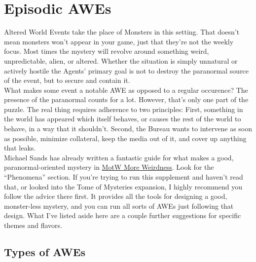 \documentclass[12pt,oneside,landscape]{memoir}
\begin{document}
\begin{multicols}{2}
\section*{Episodic AWEs}
Altered World Events take the place of Monsters in this setting.  That doesn’t mean monsters won’t appear in your game, just that they're not the weekly focus.  Most times the mystery will revolve around something weird, unpredictable, alien, or altered.  Whether the situation is simply unnatural or actively hostile the Agents’ primary goal is not to destroy the paranormal source of the event, but to secure and contain it.
\\[4mm]
What makes some event a notable AWE as opposed to a regular occurence?  The presence of the paranormal counts for a lot.  However, that's only one part of the puzzle.  The real thing requires adherence to two principles:  First, something in the world has appeared which itself behaves, or causes the rest of the world to behave, in a way that it shouldn’t.  Second, the Bureau wants to intervene as soon as possible, minimize collateral, keep the media out of it, and cover up anything that leaks.  
\\[4mm]
Michael Sands has already written a fantastic guide for what makes a good, paranormal-oriented mystery in \href{https://genericgames.co.nz/files/MotW_more_weirdness.pdf}{MotW More Weirdness}.  Look for the “Phenomena” section.  If you’re trying to run this supplement and haven’t read that, or looked into the Tome of Mysteries expansion, I highly recommend you follow the advice there first.  It provides all the tools for designing a good, monster-less mystery, and you can run all sorts of AWEs just following that design.  What I’ve listed aside here are a couple further suggestions for specific themes and flavors.

\begin{tcolorbox}[bottom=4mm]
\section*{Types of AWEs}
\begin{itemize}[leftmargin=*,parsep=1mm]


\end{itemize}
\end{tcolorbox}
\end{multicols}
\end{document}
